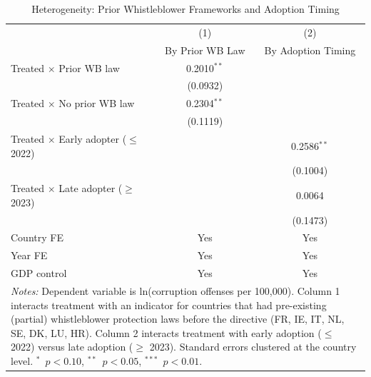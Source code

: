 \begin{table}[htbp]
\centering
\caption{Heterogeneity: Prior Whistleblower Frameworks and Adoption Timing}
\label{tab:heterogeneity}
\begin{tabular}{lcc}
\hline\hline
 & (1) & (2) \\
 & By Prior WB Law & By Adoption Timing \\
\hline
Treated $\times$ Prior WB law & 0.2010$^{**}$ & \\
 & (0.0932) & \\
Treated $\times$ No prior WB law & 0.2304$^{**}$ & \\
 & (0.1119) & \\
Treated $\times$ Early adopter ($\leq$ 2022) & & 0.2586$^{**}$ \\
 & & (0.1004) \\
Treated $\times$ Late adopter ($\geq$ 2023) & & 0.0064 \\
 & & (0.1473) \\
\hline
Country FE & Yes & Yes \\
Year FE & Yes & Yes \\
GDP control & Yes & Yes \\
\hline\hline
\multicolumn{3}{p{0.8\textwidth}}{\footnotesize \textit{Notes:} Dependent variable is ln(corruption offenses per 100,000). Column 1 interacts treatment with an indicator for countries that had pre-existing (partial) whistleblower protection laws before the directive (FR, IE, IT, NL, SE, DK, LU, HR). Column 2 interacts treatment with early adoption ($\leq$ 2022) versus late adoption ($\geq$ 2023). Standard errors clustered at the country level. $^{*}$~$p<0.10$, $^{**}$~$p<0.05$, $^{***}$~$p<0.01$.} \\
\end{tabular}
\end{table}
